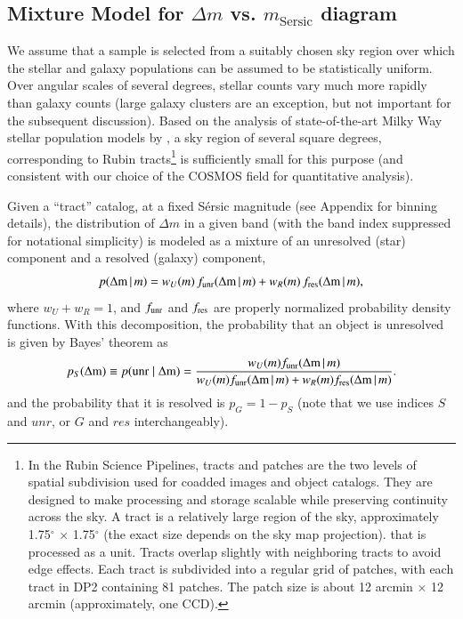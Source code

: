 \subsection{Mixture Model for \(\Delta m\) vs. \(m_{\mathrm{Sersic}}\) diagram \label{sec:mixmodel}} 

We assume that a sample is selected from a suitably chosen sky region over which the stellar and galaxy populations can be assumed to be statistically uniform. Over angular scales of
several degrees, stellar counts vary much more rapidly than galaxy counts (large galaxy clusters are
an exception, but not important for the subsequent discussion). Based on the analysis of state-of-the-art
Milky Way stellar population models by \cite{2025AJ....169..119P}, a sky region of several square
degrees, corresponding to Rubin tracts\footnote{In the Rubin Science Pipelines, tracts and patches
are the two levels of spatial subdivision used for coadded images and object catalogs. They are
designed to make processing and storage scalable while preserving continuity across the sky.
A tract is a relatively large region of the sky, approximately 1.75$^\circ$ $\times$ 1.75$^\circ$ (the exact
size depends on the sky map projection). that is processed as a unit. Tracts overlap slightly with
neighboring tracts to avoid edge effects. Each tract is subdivided into a regular grid of patches,
with each tract in DP2 containing 81 patches. The patch size is about 12 arcmin $\times$ 12 arcmin
(approximately, one CCD).}  is sufficiently small for this purpose (and consistent with our choice of
the COSMOS field for quantitative analysis). 
 
Given a ``tract'' catalog, at a fixed S\'{e}rsic magnitude (see Appendix for binning details), the
distribution of \(\Delta m\) in a given band (with the band index suppressed for notational simplicity) is
modeled as a mixture of an unresolved (star) component and a resolved (galaxy) component, 
\begin{equation}
                                p(\mathrm{\Delta m} \,|\, m) = w_U(m) \, f_{\rm unr} (\mathrm{\Delta m} \,|\, m) +  w_R(m) \, f_{\rm res} (\mathrm{\Delta m} \,|\, m),
  \label{eq:mixpdf1}
\end{equation}
where $w_U + w_R = 1$, and $f_{\rm unr}$  and $f_{\rm res}$  are properly normalized probability density
functions. With this decomposition, the probability that an object is unresolved is given by
Bayes' theorem as
\begin{equation}
        p_S(\mathrm{\Delta m}) \equiv p({\rm unr}\mid\mathrm{\Delta m})= \frac{w_U(m) f_{\rm unr}(\mathrm{\Delta m} \,|\, m)}  {w_U(m) f_{\rm unr} (\mathrm{\Delta m} \,|\, m) + w_R(m) f_{\rm res} (\mathrm{\Delta m} \,|\, m)}.
  \label{eq:pSdm} 
\end{equation}
and the probability that it is resolved is $p_G = 1 - p_S$ (note that we use indices $S$ and
$unr$, or $G$ and $res$ interchangeably). 


